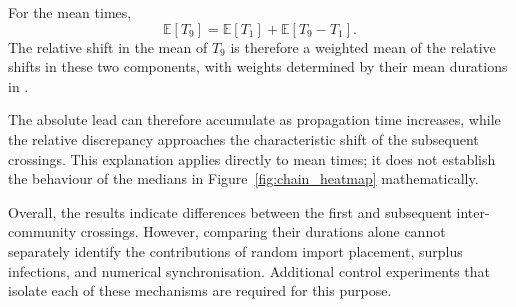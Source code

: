 For the mean times,
\begin{equation}
\mathbb{E}[T_9]
=
\mathbb{E}[T_1]
+
\mathbb{E}[T_9-T_1].
\end{equation}
The relative shift in the mean of $T_9$ is therefore a weighted mean of the relative shifts in these two components, with weights determined by their mean durations in \Full{}.

The absolute lead can therefore accumulate as propagation time increases, while the relative discrepancy approaches the characteristic shift of the subsequent crossings. This explanation applies directly to mean times; it does not establish the behaviour of the medians in Figure~\ref{fig:chain_heatmap} mathematically.

Overall, the results indicate differences between the first and subsequent inter-community crossings. However, comparing their durations alone cannot separately identify the contributions of random import placement, surplus infections, and numerical synchronisation. Additional control experiments that isolate each of these mechanisms are required for this purpose.

